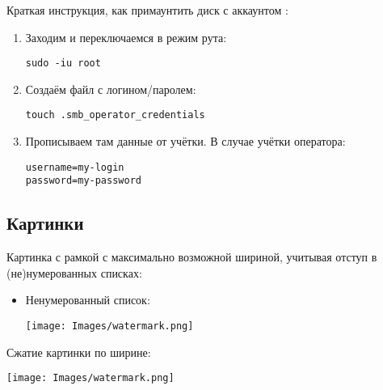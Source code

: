 Краткая инструкция, как примаунтить диск с аккаунтом :
\begin{enumerate}
  \item Заходим и переключаемся в режим рута:
        \begin{tcolorbox}
          \texttt{sudo -iu root}
        \end{tcolorbox}

  \item Создаём файл с логином/паролем:
        \begin{tcolorbox}
          \texttt{touch .smb\_operator\_credentials}
        \end{tcolorbox}

  \item Прописываем там данные от учётки. В случае учётки оператора:
        \begin{tcolorbox}
          \texttt{username=my-login} \\
          \texttt{password=my-password}
        \end{tcolorbox}

\end{enumerate}

\subsection{Картинки}

Картинка с рамкой с максимально возможной шириной, учитывая отступ в (не)нумерованных списках:
\begin{itemize}
  \item Ненумерованный список:
        \begin{center}
          \begin{minipage}[c]{\textwidth - \fboxaddlen - \itemparindent}
            \centering
            \texttt{[image: Images/watermark.png]}
          \end{minipage}
        \end{center}

\end{itemize}

Сжатие картинки по ширине:
\begin{center}
  \begin{minipage}[c]{0.9\textwidth}
    \centering
    \texttt{[image: Images/watermark.png]}
  \end{minipage}
\end{center}

